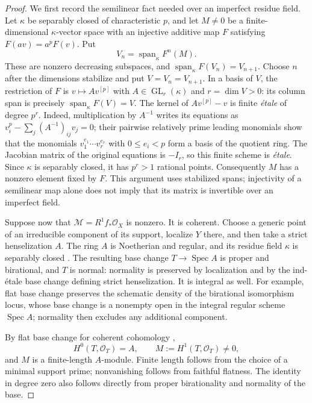\begin{proof}
We first record the semilinear fact needed over an imperfect residue
field.  Let $\kappa$ be separably closed of characteristic $p$, and
let $M\ne0$ be a finite-dimensional $\kappa$-vector space with an
injective additive map $F$ satisfying $F(av)=a^pF(v)$.  Put
\[
             V_n=\operatorname{span}_{\kappa}F^n(M).
\]
These are nonzero decreasing subspaces, and
$\operatorname{span}_{\kappa}F(V_n)=V_{n+1}$.  Choose $n$ after
the dimensions stabilize and put $V=V_n=V_{n+1}$.  In a basis
of $V$, the restriction of $F$ is $v\mapsto A v^{[p]}$ with
$A\in\operatorname{GL}_r(\kappa)$ and $r=\dim V>0$:
its column span is precisely $\operatorname{span}_{\kappa}F(V)=V$.
The kernel of $A v^{[p]}-v$ is finite \emph{\'etale} of degree
$p^r$.  Indeed, multiplication by $A^{-1}$ writes its equations
as $v_i^p-\sum_j(A^{-1})_{ij}v_j=0$; their pairwise relatively
prime leading monomials show that the monomials
$v_1^{e_1}\cdots v_r^{e_r}$ with $0\le e_i<p$ form a basis of
the quotient ring.  The Jacobian matrix of the original equations
is $-I_r$, so this finite scheme is \emph{\'etale}.  Since $\kappa$
is separably closed, it has $p^r>1$ rational points.  Consequently
$M$ has a nonzero element fixed by $F$.
This argument uses stabilized spans; injectivity of a semilinear
map alone does not imply that its matrix is invertible over an
imperfect field.

Suppose now that $\mathcal M=R^1f_*\mathcal O_X$ is nonzero.
It is coherent.  Choose a generic point of an irreducible
component of its support, localize $Y$ there, and then take a
strict henselization $A$.  The ring $A$ is Noetherian and regular,
and its residue field $\kappa$ is separably closed
\cite[Tags 06DI and 06LN]{StacksB}.  The resulting base change
$T\to\operatorname{Spec}A$ is proper and birational, and $T$
is normal: normality is preserved by localization and by the
ind-\'etale base change defining strict henselization.  It is
integral as well.  For example, flat base change preserves the
schematic density of the birational isomorphism locus, whose
base change is a nonempty open in the integral regular scheme
$\operatorname{Spec}A$; normality then excludes any additional
component.

By flat base change for coherent cohomology
\cite[Lemma 30.5.2, Tag 02KE]{StacksB},
\[
 H^0(T,\mathcal O_T)=A,\qquad
 M:=H^1(T,\mathcal O_T)\ne0,
\]
and $M$ is a finite-length $A$-module.  Finite length follows
from the choice of a minimal support prime; nonvanishing follows
from faithful flatness.  The identity in degree zero also follows
directly from proper birationality and normality of the base.


\end{proof}
